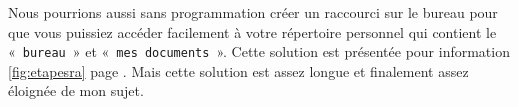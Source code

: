 Nous pourrions aussi sans programmation créer un raccourci sur le bureau pour que vous puissiez accéder facilement à votre répertoire personnel qui contient le «~\texttt{bureau}~»  et «~\texttt{mes documents}~». Cette solution est présentée pour information \autoref{fig:etapesra} page \pageref{fig:etapesra}. Mais cette solution est assez longue et finalement assez éloignée de mon sujet.

\begin{figure}[h!tb]
\centering
\end{figure}
